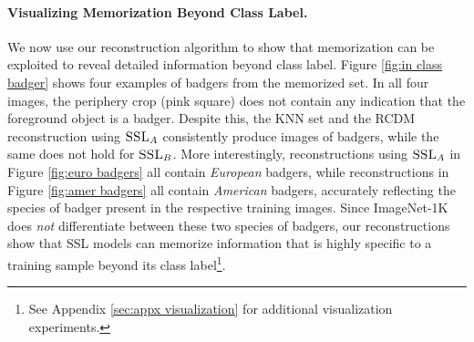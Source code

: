 \paragraph{Visualizing Memorization Beyond Class Label.}
We now use our reconstruction algorithm to show that \dejavu memorization can be exploited to reveal detailed information beyond class label. Figure \ref{fig:in class badger} shows four examples of badgers from the {\color{part_orange}memorized} set. In all four images, the periphery crop (pink square) does not contain any indication that the foreground object is a badger. Despite this, the KNN set and the RCDM reconstruction using $\textsc{SSL}_A$ consistently produce images of badgers, while the same does not hold for $\textsc{SSL}_B$.
More interestingly, reconstructions using $\textsc{SSL}_A$ in Figure \ref{fig:euro badgers} all contain \emph{European} badgers, while reconstructions in Figure \ref{fig:amer badgers} all contain \emph{American} badgers, accurately reflecting the species of badger present in the respective training images. Since ImageNet-1K does \emph{not} differentiate between these two species of badgers, our reconstructions show that SSL models can memorize information that is highly specific to a training sample beyond its class label\footnote{See Appendix \ref{sec:appx visualization} for additional visualization experiments.}.%




